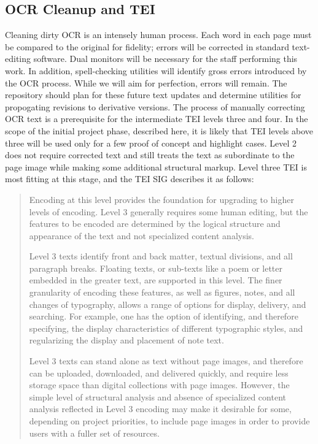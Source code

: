 \subsection{OCR Cleanup and TEI}
Cleaning dirty OCR is an intensely human process. Each word in each page must be compared to the original for fidelity; errors will be corrected in standard text-editing software. Dual monitors will be necessary for the staff performing this work. In addition, spell-checking utilities will identify gross errors introduced by the OCR process. While we will aim for perfection, errors will remain. The repository should plan for these future text updates and determine utilities for propogating revisions to derivative versions.
The process of manually correcting OCR text is a prerequisite for the intermediate TEI levels three and four. In the scope of the initial project phase, described here, it is likely that TEI levels above three will be used only for a few proof of concept and highlight cases. Level 2 does not require corrected text and still treats the text as subordinate to the page image while making some additional structural markup. Level three TEI is most fitting at this stage, and the TEI SIG describes it as follows:
\begin{quote}
\begin{singlespace}
Encoding at this level provides the foundation for upgrading to higher levels of encoding. Level 3 generally requires some human editing, but the features to be encoded are determined by the logical structure and appearance of the text and not specialized content analysis.

Level 3 texts identify front and back matter, textual divisions, and all paragraph breaks. Floating texts, or sub-texts like a poem or letter embedded in the greater text, are supported in this level. The finer granularity of encoding these features, as well as figures, notes, and all changes of typography, allows a range of options for display, delivery, and searching. For example, one has the option of identifying, and therefore specifying, the display characteristics of different typographic styles, and regularizing the display and placement of note text.

Level 3 texts can stand alone as text without page images, and therefore can be uploaded, downloaded, and delivered quickly, and require less storage space than digital collections with page images. However, the simple level of structural analysis and absence of specialized content analysis reflected in Level 3 encoding may make it desirable for some, depending on project priorities, to include page images in order to provide users with a fuller set of resources.
\cite{tei_sig_on_libraries_best_2011}
\end{singlespace}
\end{quote}
